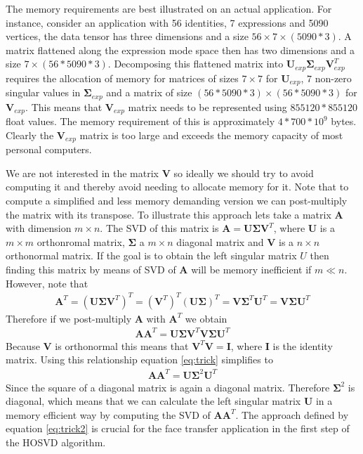 \documentclass[11pt,a4paper]{report}
\begin{document}
The memory requirements are best illustrated on an actual application. For
instance, consider an application with 56 identities, 7 expressions
and 5090 vertices, the data tensor has three dimensions and a size $56\times
7\times (5090*3)$. A
matrix flattened along the expression mode space then has two dimensions and a size
$7 \times (56*5090*3)$.  Decomposing this flattened matrix into
$\mathbf{U}_{exp} \mathbf{\Sigma}_{exp} \mathbf{V}_{exp}^T$ requires the
allocation of memory for matrices of sizes
$7\times 7$ for $\mathbf{U}_{exp}$, $7$ non-zero singular values in $\mathbf{\Sigma}_{exp}$ and a matrix of size
$(56*5090*3)\times (56*5090*3)$ for $\mathbf{V}_{exp}$. This means that
$\mathbf{V}_{exp}$ matrix needs to be represented using $855120*855120$ float values. The memory requirement of this is approximately $4*700*10^9$
bytes. Clearly the $\mathbf{V}_{exp}$ matrix is too large and exceeds the memory capacity of
most personal computers.

We are not interested in the matrix $\mathbf{V}$ so ideally we should try to
avoid computing it and thereby avoid needing to allocate memory for it. Note
that to compute a simplified and less memory demanding version we can
post-multiply the matrix with its transpose. To illustrate this approach lets
take a matrix $\mathbf{A}$ with dimension $m \times n$. The SVD of this matrix
is $\mathbf{A} = \mathbf{U\Sigma V}^T$, where $\mathbf{U}$ is a $m \times m$
orthonromal matrix, $\mathbf{\Sigma}$ a $m \times n$ diagonal matrix and $\mathbf{V}$ is a $n \times n$
orthonormal matrix. If the goal is to obtain
the left singular matrix $U$ then finding this matrix by means of SVD of
$\mathbf{A}$ will be memory inefficient if $m \ll n$. However, note that 
\begin{align}
\mathbf{A}^T = (\mathbf{U\Sigma V}^T)^T = (\mathbf{V}^T)^T(\mathbf{U\Sigma})^T
= \mathbf{V}\mathbf{\Sigma}^T\mathbf{U}^T = \mathbf{V\Sigma U}^T 
\end{align}
Therefore if we post-multiply $\mathbf{A}$ with $\mathbf{A}^T$ we obtain
\begin{align}\label{eq:trick}
\mathbf{A}\mathbf{A}^T = \mathbf{U\Sigma V}^T\mathbf{V\Sigma U}^T
\end{align}
Because $\mathbf{V}$ is orthonormal this means that $\mathbf{V}^T\mathbf{V} =
\mathbf{I}$, where $\mathbf{I}$ is the identity matrix. Using this relationship
equation \ref{eq:trick} simplifies to
\begin{align}\label{eq:trick2}
\mathbf{A}\mathbf{A}^T = \mathbf{U\Sigma}^2 \mathbf{U}^T
\end{align}
Since the square of a diagonal matrix is again a diagonal matrix. Therefore $\mathbf{\Sigma}^2$ is diagonal, which means that we can calculate the left
singular matrix $\mathbf{U}$ in a memory efficient way by computing the SVD
of $\mathbf{A}\mathbf{A}^T$. The approach defined by equation \ref{eq:trick2} is crucial for the face transfer
application in the first step of the HOSVD algorithm.
\end{document}
